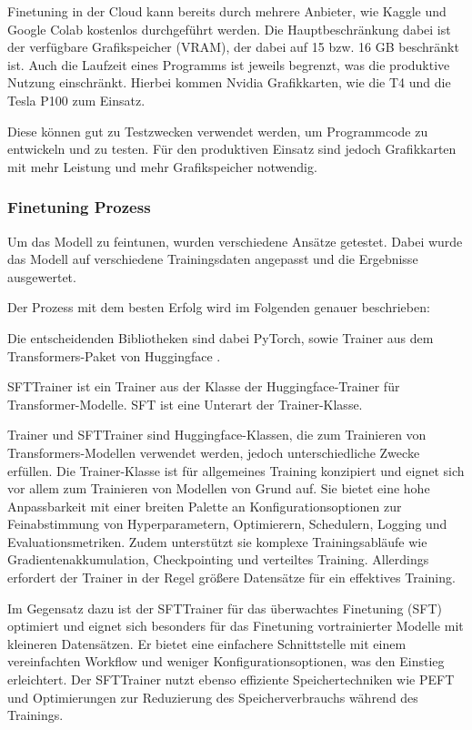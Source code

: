 \documentclass[german,report]{i1thesis}
\begin{document}
Finetuning in der Cloud kann bereits durch mehrere Anbieter, wie Kaggle und Google Colab kostenlos durchgeführt werden.
Die Hauptbeschränkung dabei ist der verfügbare Grafikspeicher (\ac{VRAM}), der dabei auf 15 bzw. 16 \ac{GB} beschränkt ist.
Auch die Laufzeit eines Programms ist jeweils begrenzt, was die produktive Nutzung einschränkt.
Hierbei kommen Nvidia Grafikkarten, wie die T4 und die Tesla P100 zum Einsatz.

Diese können gut zu Testzwecken verwendet werden, um Programmcode zu entwickeln und zu testen.
Für den produktiven Einsatz sind jedoch Grafikkarten mit mehr Leistung und mehr Grafikspeicher notwendig.

\newpage
\subsubsection{Finetuning Prozess}%
\label{subsec:Finetuning-prozess}

Um das Modell zu feintunen, wurden verschiedene Ansätze getestet.
Dabei wurde das Modell auf verschiedene Trainingsdaten angepasst und die Ergebnisse ausgewertet.

Der Prozess mit dem besten Erfolg wird im Folgenden genauer beschrieben:

Die entscheidenden Bibliotheken sind dabei PyTorch, sowie Trainer aus dem Transformers-Paket von Huggingface \autocite{huggingface}.

\ac{SFTTrainer} \autocite{sfttrainer} ist ein Trainer aus der Klasse der Huggingface-Trainer für Transformer-Modelle.
\ac{SFT} ist eine Unterart der Trainer-Klasse.

Trainer und \ac{SFTTrainer} sind Huggingface-Klassen, die zum Trainieren von Transformers-Modellen verwendet werden, jedoch unterschiedliche Zwecke erfüllen.
Die Trainer-Klasse ist für allgemeines Training konzipiert und eignet sich vor allem zum Trainieren von Modellen von Grund auf.
Sie bietet eine hohe Anpassbarkeit mit einer breiten Palette an Konfigurationsoptionen zur Feinabstimmung von Hyperparametern, Optimierern, Schedulern, Logging und Evaluationsmetriken.
Zudem unterstützt sie komplexe Trainingsabläufe wie Gradientenakkumulation, Checkpointing und verteiltes Training.
Allerdings erfordert der Trainer in der Regel größere Datensätze für ein effektives Training.

Im Gegensatz dazu ist der \ac{SFTTrainer} für das überwachtes Finetuning (\ac{SFT}) optimiert und eignet sich besonders für das Finetuning vortrainierter Modelle mit kleineren Datensätzen.
Er bietet eine einfachere Schnittstelle mit einem vereinfachten Workflow und weniger Konfigurationsoptionen, was den Einstieg erleichtert.
Der \ac{SFTTrainer} nutzt ebenso effiziente Speichertechniken wie \ac{PEFT} und Optimierungen zur Reduzierung des Speicherverbrauchs während des Trainings.
\end{document}
